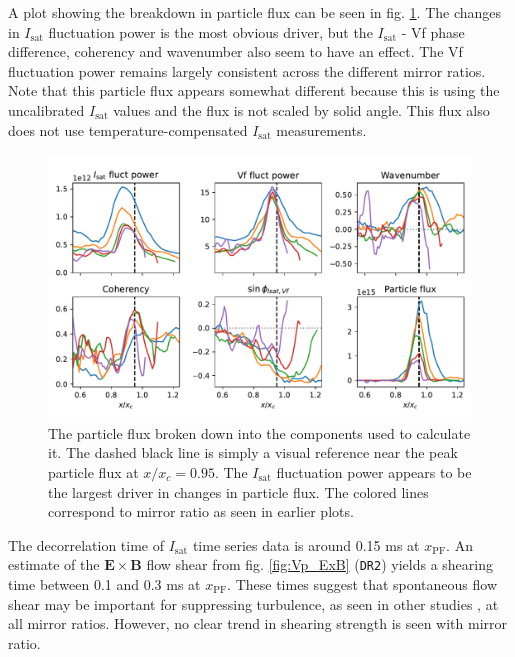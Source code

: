 A plot showing the breakdown in particle flux can be seen in fig. \ref{fig_extra:particle_flux_breakdown}. The changes in $I_\text{sat}$ fluctuation power is the most obvious driver, but the $I_\text{sat}$ - Vf phase difference, coherency and wavenumber also seem to have an effect. The Vf fluctuation power remains largely consistent across the different mirror ratios. Note that this particle flux appears somewhat different because this is using the uncalibrated $I_\text{sat}$ values and the flux is not scaled by solid angle. This flux also does not use temperature-compensated $I_\text{sat}$ measurements.

\begin{figure}
    \centering
    \includegraphics[width=400pt]{figures/extra/particle_flux_breakdown.pdf}
    \caption[Particle flux: breakdown into components]{The particle flux broken down into the components used to calculate it. The dashed black line is simply a visual reference near the peak particle flux at $x/x_c=0.95$. The $I_\text{sat}$ fluctuation power appears to be the largest driver in changes in particle flux. The colored lines correspond to mirror ratio as seen in earlier plots.}
    \label{fig_extra:particle_flux_breakdown}
\end{figure}

The decorrelation time of $I_\text{sat}$ time series data is around 0.15 ms at $x_\text{PF}$. An estimate of the $\boldsymbol{E \times B}$ flow shear from fig. \ref{fig:Vp_ExB} (\texttt{DR2}) yields a shearing time between 0.1 and 0.3 ms at $x_\text{PF}$. These times suggest that spontaneous flow shear may be important for suppressing turbulence, as seen in other studies \cite{Schaffner_turbulence_2013,Cho_2005}, at all mirror ratios. However, no clear trend in shearing strength is seen with mirror ratio.

